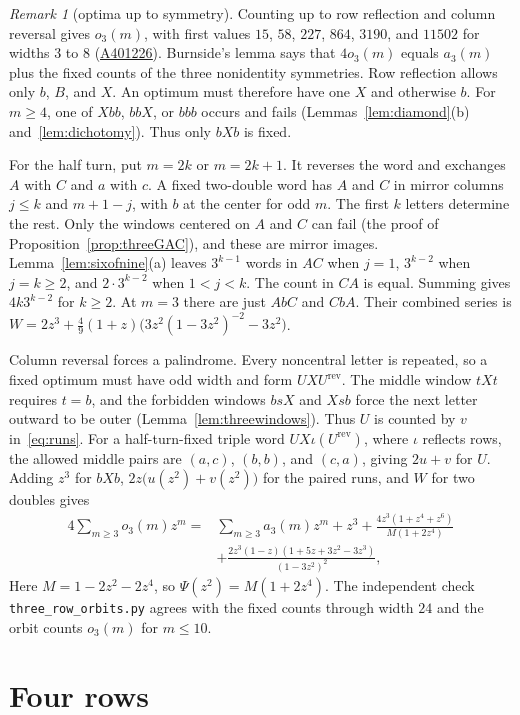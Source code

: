 \documentclass[12pt]{article}
\theoremstyle{plain}
\theoremstyle{definition}
\theoremstyle{remark}
\newtheorem{remark}[theorem]{Remark}
\newcommand{\seqnum}[1]{\href{https://oeis.org/#1}{\rm \underline{#1}}}
\begin{document}
\begin{remark}[optima up to symmetry]\label{rem:threeorbits}
Counting up to row reflection and column reversal gives $o_3(m)$,
with first values $15$, $58$, $227$, $864$, $3190$, and $11502$
for widths $3$ to $8$ (\seqnum{A401226}). Burnside's lemma says that
$4o_3(m)$ equals $a_3(m)$ plus the fixed counts of the three nonidentity
symmetries. Row reflection allows only $b$, $B$, and $X$.
An optimum must therefore have one $X$ and otherwise $b$.
For $m\ge4$, one of $Xbb$, $bbX$, or $bbb$ occurs and fails
(Lemmas~\ref{lem:diamond}(b) and~\ref{lem:dichotomy}).
Thus only $bXb$ is fixed.

For the half turn, put $m=2k$ or $m=2k+1$.
It reverses the word and exchanges $A$ with $C$ and $a$ with $c$.
A fixed two-double word has $A$ and $C$ in mirror columns $j\le k$
and $m+1-j$, with $b$ at the center for odd $m$.
The first $k$ letters determine the rest. Only the windows centered
on $A$ and $C$ can fail (the proof of Proposition~\ref{prop:threeGAC}),
and these are mirror images. Lemma~\ref{lem:sixofnine}(a) leaves
$3^{k-1}$ words in $AC$ when $j=1$, $3^{k-2}$ when $j=k\ge2$,
and $2\cdot3^{k-2}$ when $1<j<k$. The count in $CA$ is equal.
Summing gives $4k3^{k-2}$ for $k\ge2$.
At $m=3$ there are just $AbC$ and $CbA$. Their combined series is
$W=2z^3+\frac49(1+z)\bigl(3z^2(1-3z^2)^{-2}-3z^2\bigr)$.

Column reversal forces a palindrome. Every noncentral letter is
repeated, so a fixed optimum must have odd width and form
$UXU^{\mathrm{rev}}$. The middle window $tXt$ requires $t=b$,
and the forbidden windows $bsX$ and $Xsb$ force the next letter
outward to be outer (Lemma~\ref{lem:threewindows}). Thus $U$ is
counted by $v$ in~\eqref{eq:runs}.
For a half-turn-fixed triple word $UX\iota(U^{\mathrm{rev}})$,
where $\iota$ reflects rows, the allowed middle pairs are
$(a,c)$, $(b,b)$, and $(c,a)$, giving $2u+v$ for $U$.
Adding $z^3$ for $bXb$, $2z\bigl(u(z^2)+v(z^2)\bigr)$ for the paired runs,
and $W$ for two doubles gives
\begin{align*}
4\sum_{m\ge3}o_3(m)z^m={}&\sum_{m\ge3}a_3(m)z^m+z^3+\frac{4z^3(1+z^4+z^6)}{M(1+2z^4)}\\
&+\frac{2z^3(1-z)(1+5z+3z^2-3z^3)}{(1-3z^2)^2},
\end{align*}
Here $M=1-2z^2-2z^4$, so $\Psi(z^2)=M(1+2z^4)$.
The independent check \nolinkurl{three_row_orbits.py} agrees with the
fixed counts through width $24$ and the orbit counts $o_3(m)$ for $m\le10$.
\end{remark}
\section{Four rows}\label{sec:four}
\end{document}
